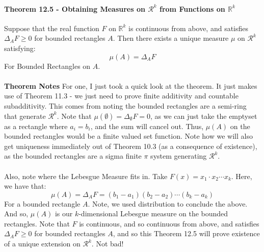 \documentclass[12pt,a4paper]{article}
\newcommand{\1}[1]{\mathbbm{1}\left\{ #1 \right\}}
\newcommand{\R}{\mathbb{R}}
\newcommand{\rcal}{\mathcal{R}}
\begin{document}
\paragraph{Theorem 12.5 - Obtaining Measures on $\rcal^k$ from Functions on $\R^k$} Suppose that the real function $F$ on $\R^k$ is continuous from above, and satisfies $\Delta_A F \geq 0$ for bounded rectangles $A$. Then there exists a unique measure $\mu$ on $\rcal^k$ satisfying:
$$
	\mu(A) = \Delta_A F
$$
For Bounded Rectangles on $A$.
\\\\
\textbf{Theorem Notes} For one, I just took a quick look at the theorem. It just makes use of Theorem 11.3 - we just need to prove finite additivity and countable subadditivity. This comes from noting the bounded rectangles are a semi-ring that generate $\rcal^k$. Note that $\mu(\emptyset) = \Delta_\emptyset F = 0$, as we can just take the emptyset as a rectangle where $a_i = b_i$, and the sum will cancel out. Thus, $\mu(A)$ on the bounded rectangles would be a finite valued set function. Note how we will also get uniqueness immediately out of Theorem 10.3 (as a consequence of existence), as the bounded rectangles are a sigma finite $\pi$ system generating $\rcal^k$.
\\\\
Also, note where the Lebesgue Measure fits in. Take $F(x) = x_1 \cdot x_2 \cdots x_k$. Here, we have that:
$$
	\mu(A) = \Delta_A F = (b_1 - a_1)(b_2 - a_2)\cdots(b_k - a_k)
$$
For a bounded rectangle $A$. Note, we used distribution to conclude the above. And so, $\mu(A)$ is our $k$-dimensional Lebesgue measure on the bounded rectangles. Note that $F$ is continuous, and so continuous from above, and satisfies $\Delta_A F \geq 0$ for bounded rectangles $A$, and so this Theorem 12.5 will prove existence of a unique extension on $\rcal^k$. Not bad!
\end{document}
